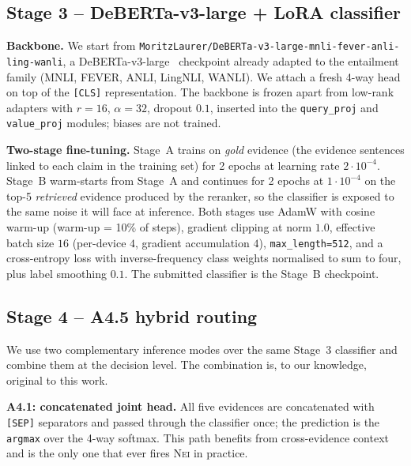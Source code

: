 \documentclass[11pt]{article}
\begin{document}
\subsection{Stage 3 -- DeBERTa-v3-large + LoRA classifier}
\label{sec:classifier}
\textbf{Backbone.} We start from
\texttt{MoritzLaurer/DeBERTa-v3-large-mnli-fever-anli-ling-wanli}, a
DeBERTa-v3-large~\citep{he2021deberta} checkpoint already adapted to
the entailment family (MNLI, FEVER, ANLI, LingNLI, WANLI). We attach
a fresh 4-way head on top of the \verb|[CLS]| representation. The
backbone is frozen apart from low-rank adapters
\citep{hu2022lora} with $r{=}16$, $\alpha{=}32$, dropout $0.1$,
inserted into the \texttt{query\_proj} and \texttt{value\_proj}
modules; biases are not trained.

\textbf{Two-stage fine-tuning.} Stage~A trains on
\emph{gold} evidence (the evidence sentences linked to each claim in
the training set) for 2 epochs at learning rate $2{\cdot}10^{-4}$.
Stage~B warm-starts from Stage~A and continues for 2 epochs at
$1{\cdot}10^{-4}$ on the top-5 \emph{retrieved} evidence produced by
the reranker, so the classifier is exposed to the same noise it will
face at inference. Both stages use AdamW with cosine warm-up
(warm-up = 10\% of steps), gradient clipping at norm $1.0$, effective
batch size $16$ (per-device $4$, gradient accumulation $4$),
\verb|max_length=512|, and a cross-entropy loss with
inverse-frequency class weights normalised to sum to four, plus
label smoothing $0.1$. The submitted classifier is the Stage~B
checkpoint.

\subsection{Stage 4 -- A4.5 hybrid routing}
\label{sec:routing}
We use two complementary inference modes over the same Stage~3
classifier and combine them at the decision level. The combination
is, to our knowledge, original to this work.

\textbf{A4.1: concatenated joint head.} All five evidences are
concatenated with \verb|[SEP]| separators and passed through the
classifier once; the prediction is the \verb|argmax| over the 4-way
softmax. This path benefits from cross-evidence context and is the
only one that ever fires \textsc{Nei} in practice.
\end{document}
